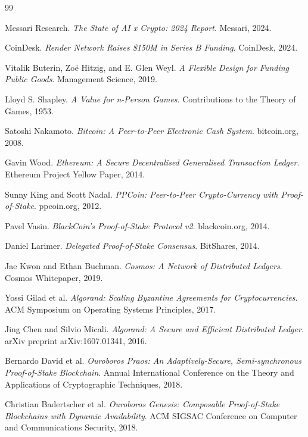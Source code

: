 \begin{thebibliography}{99}

Messari Research.
\textit{The State of AI x Crypto: 2024 Report}.
Messari, 2024.

CoinDesk.
\textit{Render Network Raises \$150M in Series B Funding}.
CoinDesk, 2024.

Vitalik Buterin, Zoë Hitzig, and E. Glen Weyl.
\textit{A Flexible Design for Funding Public Goods}.
Management Science, 2019.

Lloyd S. Shapley.
\textit{A Value for n-Person Games}.
Contributions to the Theory of Games, 1953.

Satoshi Nakamoto.
\textit{Bitcoin: A Peer-to-Peer Electronic Cash System}.
bitcoin.org, 2008.

Gavin Wood.
\textit{Ethereum: A Secure Decentralised Generalised Transaction Ledger}.
Ethereum Project Yellow Paper, 2014.

Sunny King and Scott Nadal.
\textit{PPCoin: Peer-to-Peer Crypto-Currency with Proof-of-Stake}.
ppcoin.org, 2012.

Pavel Vasin.
\textit{BlackCoin's Proof-of-Stake Protocol v2}.
blackcoin.org, 2014.

Daniel Larimer.
\textit{Delegated Proof-of-Stake Consensus}.
BitShares, 2014.

Jae Kwon and Ethan Buchman.
\textit{Cosmos: A Network of Distributed Ledgers}.
Cosmos Whitepaper, 2019.

Yossi Gilad et al.
\textit{Algorand: Scaling Byzantine Agreements for Cryptocurrencies}.
ACM Symposium on Operating Systems Principles, 2017.

Jing Chen and Silvio Micali.
\textit{Algorand: A Secure and Efficient Distributed Ledger}.
arXiv preprint arXiv:1607.01341, 2016.

Bernardo David et al.
\textit{Ouroboros Praos: An Adaptively-Secure, Semi-synchronous Proof-of-Stake Blockchain}.
Annual International Conference on the Theory and Applications of Cryptographic Techniques, 2018.

Christian Badertscher et al.
\textit{Ouroboros Genesis: Composable Proof-of-Stake Blockchains with Dynamic Availability}.
ACM SIGSAC Conference on Computer and Communications Security, 2018.


\end{thebibliography}
